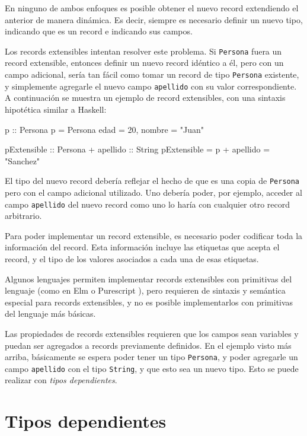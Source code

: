 En ninguno de ambos enfoques es posible obtener el nuevo record extendiendo el anterior de manera dinámica. Es decir, siempre es necesario definir un nuevo tipo, indicando que es un record e indicando sus campos.

Los records extensibles intentan resolver este problema. Si \texttt{Persona} fuera un record extensible, entonces definir un nuevo record idéntico a él, pero con un campo adicional, sería tan fácil como tomar un record de tipo \texttt{Persona} existente, y simplemente agregarle el nuevo campo \texttt{apellido} con su valor correspondiente. A continuación se muestra un ejemplo de record extensibles, con una sintaxis hipotética similar a Haskell:

\begin{code}
p :: Persona
p = Persona { edad = 20, nombre = "Juan" }

pExtensible :: Persona + { apellido :: String }
pExtensible = p + { apellido = "Sanchez" }
\end{code}

El tipo del nuevo record debería reflejar el hecho de que es una copia de \texttt{Persona} pero con el campo adicional utilizado. Uno debería poder, por ejemplo, acceder al campo \texttt{apellido} del nuevo record como uno lo haría con cualquier otro record arbitrario.

Para poder implementar un record extensible, es necesario poder codificar toda la información del record. Esta información incluye las etiquetas que acepta el record, y el tipo de los valores asociados a cada una de esas etiquetas.

Algunos lenguajes permiten implementar records extensibles con primitivas del lenguaje (como en Elm \cite{ElmRecords} o Purescript \cite{PurescriptRecords}), pero requieren de sintaxis y semántica especial para records extensibles, y no es posible implementarlos con primitivas del lenguaje más básicas.

Las propiedades de records extensibles requieren que los campos sean variables y puedan ser agregados a records previamente definidos. En el ejemplo visto más arriba, básicamente se espera poder tener un tipo \texttt{Persona}, y poder agregarle un campo \texttt{apellido} con el tipo \texttt{String}, y que esto sea un nuevo tipo. Esto se puede realizar con \textit{tipos dependientes}.

\section{Tipos dependientes}


